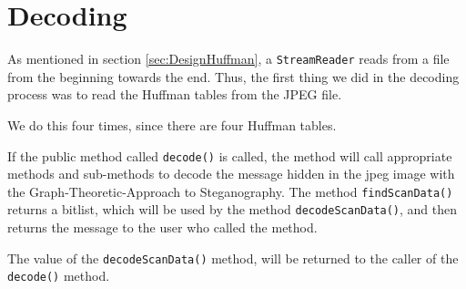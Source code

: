\section{Decoding}
As mentioned in section \ref{sec:DesignHuffman}, a \lstinline|StreamReader| reads from a file from the beginning towards the end.
Thus, the first thing we did in the decoding process was to read the Huffman tables from the JPEG file. 

We do this four times, since there are four Huffman tables.

If the public method called \lstinline|decode()| is called, the method will call appropriate methods and sub-methods to decode the message hidden in the jpeg image with the Graph-Theoretic-Approach to Steganography.
The method \lstinline|findScanData()| returns a bitlist, which will be used by the method \lstinline|decodeScanData()|, and then returns the message to the user who called the method.


The value of the \lstinline|decodeScanData()| method, will be returned to the caller of the \lstinline|decode()| method.
